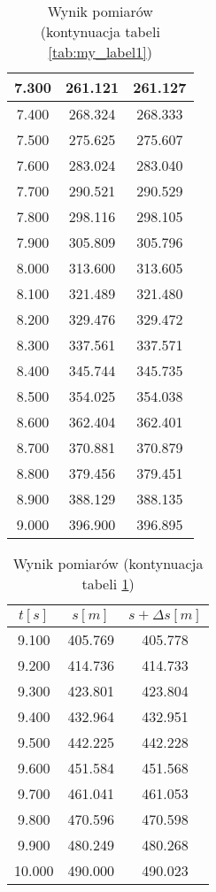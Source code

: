 \documentclass[a4paper,12pt]{article}
\begin{document}
\begin{table}[b]
\begin{tabular}{|c|c|c|}
        \hline
        7.300&	261.121&	261.127\\
        \hline
        7.400&	268.324&	268.333\\
        \hline
        7.500&	275.625&	275.607\\
        \hline
        7.600&	283.024&	283.040\\
        \hline
        7.700&	290.521&	290.529\\
        \hline
        7.800&	298.116&	298.105\\
        \hline
        7.900&	305.809&	305.796\\
        \hline
        8.000&	313.600&	313.605\\
        \hline
        8.100&	321.489&	321.480\\
        \hline
        8.200&	329.476&	329.472\\
        \hline
        8.300&	337.561&	337.571\\
        \hline
        8.400&	345.744&	345.735\\
        \hline
        8.500&	354.025&	354.038\\
        \hline
        8.600&	362.404&	362.401\\
        \hline
        8.700&	370.881&	370.879\\
        \hline
        8.800&	379.456&	379.451\\
        \hline
        8.900&	388.129&	388.135\\
        \hline
        9.000&	396.900&	396.895\\
        \hline
\end{tabular}
\caption{Wynik pomiarów (kontynuacja tabeli \ref{tab:my_label1})}
\label{tab:my_label2}
\end{table}

\begin{table}[h]
    \centering
    \begin{tabular}{|c|c|c|}
        \hline
        $t[s]$ & $s[m]$ & $s+\Delta s[m]$ \\
        \hline
        9.100&	405.769&	405.778\\
        \hline
        9.200&	414.736&	414.733\\
        \hline
        9.300&	423.801&	423.804\\
        \hline
        9.400&	432.964&	432.951\\
        \hline
        9.500&	442.225&	442.228\\
        \hline
        9.600&	451.584&	451.568\\
        \hline
        9.700&	461.041&	461.053\\
        \hline
        9.800&	470.596&	470.598\\
        \hline
        9.900&	480.249&	480.268\\
        \hline
        10.000&	490.000&	490.023\\ 
        \hline
    \end{tabular}
    \caption{Wynik pomiarów (kontynuacja tabeli \ref{tab:my_label2})}
    \label{tab:my_label3}
\end{table}
\end{document}
